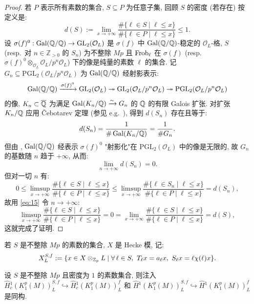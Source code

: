 \begin{proof}
若 $P$ 表示所有素数的集合, $S \subseteq P$ 为任意子集, 回顾 $S$ 的密度 (若存在) 按定义是:
\[
d(S) := \lim_{x \to +\infty} \frac{\#\{\ell \in S \mid \ell \le x\}}{\#\{\ell \in P \mid \ell \le x\}} \le 1.
\]
设 $\sigma(f)^{0} : \operatorname{Gal}(\mathbb{Q}/\mathbb{Q}) \to \mathrm{GL}_2(\mathcal{O}_L)$ 是 $\sigma(f)$ 中 $\operatorname{Gal}(\mathbb{Q}/\mathbb{Q})$-稳定的 $\mathcal{O}_L$-格, $S$ (resp.\ 对 $n \in \mathbb{Z}_{>0}$ 的 $S_n$) 为不整除 $Mp$ 且 $\operatorname{Frob}_{\ell}$ 在 $\sigma(f)$ (resp.\ $\sigma(f)^{0} \otimes_{\mathcal{O}_L} \mathcal{O}_L/p^{n}\mathcal{O}_L$) 下的像是纯量的素数 $\ell$ 的集合.
记 $G_n \subseteq \mathrm{PGL}_2(\mathcal{O}_L/p^{n}\mathcal{O}_L)$ 为 $\operatorname{Gal}(\mathbb{Q}/\mathbb{Q})$ 经射影表示:
\[
\operatorname{Gal}(\mathbb{Q}/\mathbb{Q}) \xrightarrow{\sigma(f)^{0}} \mathrm{GL}_2(\mathcal{O}_L) \twoheadrightarrow \mathrm{GL}_2(\mathcal{O}_L/p^{n}\mathcal{O}_L) \twoheadrightarrow \mathrm{PGL}_2(\mathcal{O}_L/p^{n}\mathcal{O}_L)
\]
的像, $K_n \subset \overline{\mathbb{Q}}$ 为满足 $\operatorname{Gal}(K_n/\mathbb{Q}) \xrightarrow{\sim} G_n$ 的 $\mathbb{Q}$ 的有限 Galois 扩张.
对扩张 $K_n/\mathbb{Q}$ 应用 \v{C}ebotarev 定理 (参见 e.g.\ \cite[\S2.1]{ref:46}), 得到 $d(S_n)$ 存在且等于:
\[
d(S_n) = \frac{1}{\#\operatorname{Gal}(K_n/\mathbb{Q})} = \frac{1}{\#G_n}.
\]
但由 \cite[Th.~4.3]{ref:39}, $\operatorname{Gal}(\mathbb{Q}/\mathbb{Q})$ 经表示 $\sigma(f)^{0}$ "射影化"在 $\mathrm{PGL}_2(\mathcal{O}_L)$ 中的像是无限的, 故 $G_n$ 的基数随 $n$ 趋于 $+\infty$, 从而:
\begin{equation}
\label{eq:15}
\lim_{n \to +\infty} d(S_n) = 0.
\end{equation}
但对一切 $n$ 有:
\[
0 \le \limsup_{x \to +\infty} \frac{\#\{\ell \in S \mid \ell \le x\}}{\#\{\ell \in P \mid \ell \le x\}} \le \limsup_{x \to +\infty} \frac{\#\{\ell \in S_n \mid \ell \le x\}}{\#\{\ell \in P \mid \ell \le x\}} = d(S_n),
\]
故用 \eqref{eq:15} 令 $n \to +\infty$:
\[
\limsup_{x \to +\infty} \frac{\#\{\ell \in S \mid \ell \le x\}}{\#\{\ell \in P \mid \ell \le x\}} = 0 = \lim_{x \to +\infty} \frac{\#\{\ell \in S \mid \ell \le x\}}{\#\{\ell \in P \mid \ell \le x\}} = d(S),
\]
这就完成了证明.
\end{proof}

若 $S$ 是不整除 $Mp$ 的素数的集合, $X$ 是 Hecke 模, 记:
\[
X_{L}^{S,f} := \{x \in X \otimes_{\Zp} L \mid \forall\, \ell \in S,\ T_{\ell}x = a_{\ell}x,\ S_{\ell}x = \ell\chi(\ell)x\}.
\]

\begin{lemma}\label{lem:3.2.2}
设 $S$ 是不整除 $Mp$ 且密度为 $1$ 的素数集合, 则注入 $\widehat{H}{}_{c}^{1}(K_1^{p}(M))_L^{S,f} \hookrightarrow \widehat{H}{}_{c}^{1}(K_1^{p}(M))_L^{f}$ 和 $\widehat{H}{}^{1}(K_1^{p}(M))_L^{S,f} \hookrightarrow \widehat{H}{}^{1}(K_1^{p}(M))_L^{f}$ 是同构.
\end{lemma}

